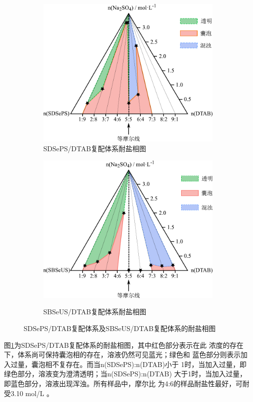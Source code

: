 \documentclass[bachelor,fandolfonts,replaceperiod]{jnuthesis}
\begin{document}
    \begin{figure}[htbp]
        \centering
        \begin{subfigure}[]{\textwidth}
            \centering
            \includegraphics[width=0.52\linewidth]{figure/SDSePS-salt.pdf}
            \caption{SDSePS/DTAB复配体系耐盐相图}\label{fig:SDSePS-salt}
        \end{subfigure}%

        \begin{subfigure}[]{\textwidth}
            \centering
            \includegraphics[width=0.52\linewidth]{figure/SBSeUS-salt.pdf}\\
            \caption{SBSeUS/DTAB复配体系耐盐相图}\label{fig:SBSeUS-salt}
        \end{subfigure}%
        \caption{SDSePS/DTAB复配体系及SBSeUS/DTAB复配体系的耐盐相图}
        \label{fig:耐盐相图}
    \end{figure}

    图\ref{fig:SDSePS-salt}为SDSePS/DTAB复配体系的耐盐相图，其中红色部分表示在此
    浓度的存在下，体系尚可保持囊泡相的存在，溶液仍然可见蓝光；绿色和
    蓝色部分则表示加入过量，囊泡相不复存在。而当n(SDSePS):n(DTAB)小于
    1时，当加入过量，即绿色部分，溶液变为澄清透明；当n(SDSePS):n(DTAB)
    大于1时，当加入过量，即蓝色部分，溶液出现浑浊。所有样品中，摩尔比
    为4:6的样品耐盐性最好，可耐受3.10 mol/L 。
    
\end{document}
